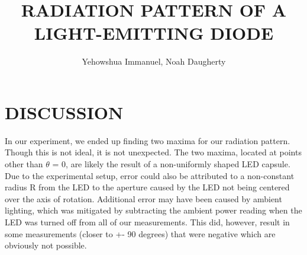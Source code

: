 \documentclass[10pt,a4paper]{article}
\title{RADIATION PATTERN OF A LIGHT-EMITTING DIODE}
\author{Yehowshua Immanuel, Noah Daugherty}
\begin{document}
\maketitle
\tableofcontents
\newpage






\section{DISCUSSION}
In our experiment, we ended up finding two maxima for our radiation pattern. Though this is not ideal, it is not unexpected. The two maxima, located at points other than $\theta$ = 0, are likely the result of a non-uniformly shaped LED capsule. Due to the experimental setup, error could also be attributed to a non-constant radius R from the LED to the aperture caused by the LED not being centered over the axis of rotation. Additional error may have been caused by ambient lighting, which was mitigated by subtracting the ambient power reading when the LED was turned off from all of our measurements. This did, however, result in some measurements (closer to +- 90 degrees) that were negative which are obviously not possible. 

\newpage

\end{document}
